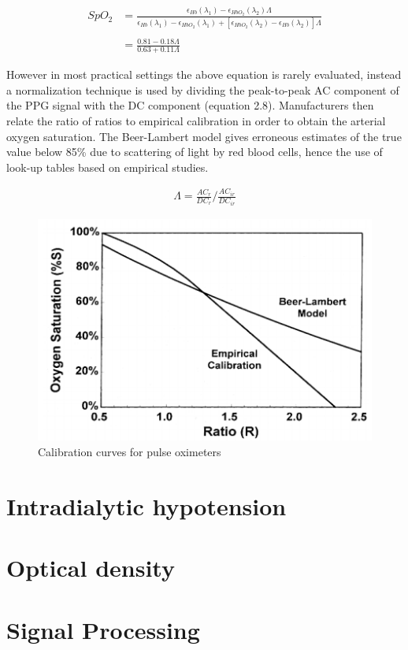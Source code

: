 \documentclass{report}
\begin{document}
 \begin{equation}
\begin{split}
SpO_{2} & = \frac{\epsilon_{Hb}(\lambda_{1}) - \epsilon_{HbO_{2}}(\lambda_{2})\Lambda}{\epsilon_{Hb}(\lambda_{1}) - \epsilon_{HbO_{2}}(\lambda_{1}) + [\epsilon_{HbO_{2}}(\lambda_{2}) - \epsilon_{Hb}(\lambda_{2})]\Lambda} \\ \\
& = \frac{0.81 - 0.18\Lambda}{0.63 + 0.11\Lambda}
\end{split}
\end{equation}

\noindent
However in most practical settings the above equation is rarely evaluated, instead a normalization technique is used by dividing the peak-to-peak AC component of the PPG signal with the DC component (equation 2.8). Manufacturers then relate the ratio of ratios to empirical calibration in order to obtain the arterial oxygen saturation. The Beer-Lambert model gives erroneous estimates of the true value below 85\% due to scattering of light by red blood cells, hence the use of look-up tables based on empirical studies. 

 \begin{equation}
\begin{split}
\Lambda  = \frac{AC_{r}}{DC_{r}} \Big/ \frac{AC_{ir}}{DC_{ir}}
\end{split}
\end{equation}

\begin{figure}[H]
\centering
  \includegraphics[width=.36\linewidth]{beer}
  \caption{Calibration curves for pulse oximeters}
\end{figure}


\section{Intradialytic hypotension}

\section{Optical density}

\section{Signal Processing}
\end{document}
